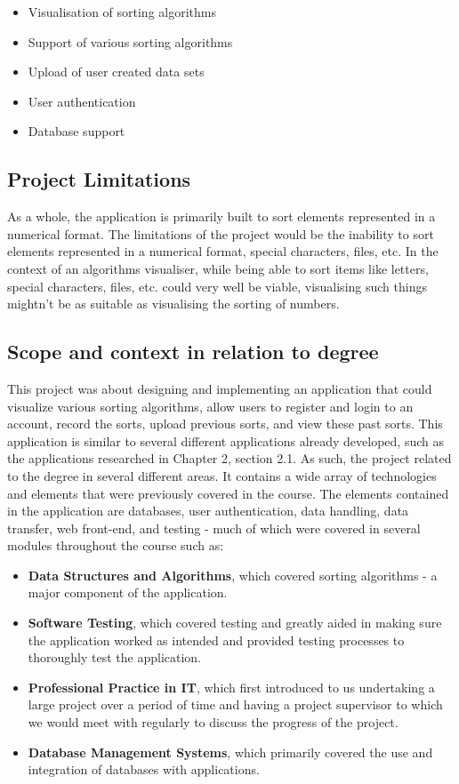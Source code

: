 \begin{itemize}
    \item Visualisation of sorting algorithms
    \item Support of various sorting algorithms
    \item Upload of user created data sets
    \item User authentication
    \item Database support
\end{itemize}

\subsection{Project Limitations}
As a whole, the application is primarily built to sort elements represented in a
numerical format. The limitations of the project would be the inability to sort 
elements represented in a numerical format, special characters, files, etc. In the context of an algorithms visualiser, while being able to sort items like letters, special characters, files, etc. could very well be viable, visualising such things mightn't be as suitable as visualising the sorting of numbers.

\newpage
\subsection{Scope and context in relation to degree}
This project was about designing and implementing an application that could visualize various sorting algorithms, allow users to register and login to an account, record the sorts, upload previous sorts, and view these past sorts. This application is similar to several different applications already developed, such as the applications researched in Chapter 2, section 2.1. As such, the project related to the degree in several different areas. It contains a wide array of technologies and elements that were previously covered in the course. The elements contained in the application are databases, user authentication, data handling, data transfer, web front-end, and testing - much of which were covered in several modules throughout the course such as: 

\begin{itemize}
    \item \textbf{Data Structures and Algorithms}, which covered sorting algorithms - a major component of the application.
    \item \textbf{Software Testing}, which covered testing and greatly aided in making sure the application worked as intended and provided testing processes to thoroughly test the application.
    \item \textbf{Professional Practice in IT}, which first introduced to us undertaking a large project over a period of time and having a project supervisor to which we would meet with regularly to discuss the progress of the project.
    \item \textbf{Database Management Systems}, which primarily covered the use and integration of databases with applications.
\end{itemize}